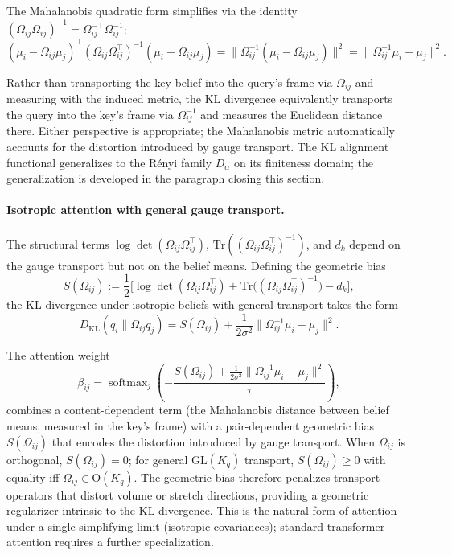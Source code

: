 The Mahalanobis quadratic form simplifies via the identity $(\Omega_{ij}\Omega_{ij}^\top)^{-1} = \Omega_{ij}^{-\top}\Omega_{ij}^{-1}$:
\begin{equation}
(\mu_i - \Omega_{ij}\mu_j)^\top(\Omega_{ij}\Omega_{ij}^\top)^{-1}(\mu_i - \Omega_{ij}\mu_j) = \|\Omega_{ij}^{-1}(\mu_i - \Omega_{ij}\mu_j)\|^2 = \|\Omega_{ij}^{-1}\mu_i - \mu_j\|^2.
\label{eq:mahalanobis_identity}
\end{equation}

Rather than transporting the key belief into the query's frame via $\Omega_{ij}$ and measuring with the induced metric, the KL divergence equivalently transports the query into the key's frame via $\Omega_{ij}^{-1}$ and measures the Euclidean distance there. Either perspective is appropriate; the Mahalanobis metric automatically accounts for the distortion introduced by gauge transport. The KL alignment functional generalizes to the R\'enyi family $D_\alpha$ on its finiteness domain; the generalization is developed in the paragraph closing this section.

\paragraph{Isotropic attention with general gauge transport.}

The structural terms $\log\det(\Omega_{ij}\Omega_{ij}^\top)$, $\mathrm{Tr}((\Omega_{ij}\Omega_{ij}^\top)^{-1})$, and $d_k$ depend on the gauge transport but not on the belief means. Defining the geometric bias
\begin{equation}
S(\Omega_{ij}) := \frac{1}{2}\Big[\log\det(\Omega_{ij}\Omega_{ij}^\top) + \mathrm{Tr}\big((\Omega_{ij}\Omega_{ij}^\top)^{-1}\big) - d_k\Big],
\end{equation}
the KL divergence under isotropic beliefs with general transport takes the form
\begin{equation}
D_{\mathrm{KL}}(q_i \| \Omega_{ij} q_j) = S(\Omega_{ij}) + \frac{1}{2\sigma^2}\|\Omega_{ij}^{-1}\mu_i - \mu_j\|^2.
\end{equation}

The attention weight
\begin{equation}
\beta_{ij} = \operatorname{softmax}_j\left(-\frac{S(\Omega_{ij}) + \frac{1}{2\sigma^2}\|\Omega_{ij}^{-1}\mu_i - \mu_j\|^2}{\tau}\right),
\end{equation}
combines a content-dependent term (the Mahalanobis distance between belief means, measured in the key's frame) with a pair-dependent geometric bias $S(\Omega_{ij})$ that encodes the distortion introduced by gauge transport. When $\Omega_{ij}$ is orthogonal, $S(\Omega_{ij}) = 0$; for general $\mathrm{GL}(K_q)$ transport, $S(\Omega_{ij}) \geq 0$ with equality iff $\Omega_{ij} \in \mathrm{O}(K_q)$. The geometric bias therefore penalizes transport operators that distort volume or stretch directions, providing a geometric regularizer intrinsic to the KL divergence. This is the natural form of attention under a single simplifying limit (isotropic covariances); standard transformer attention requires a further specialization.

